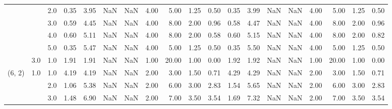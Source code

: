 \begin{tabular}{lllrrrrrrrrrrrrrrrr}
       &     & 2.0  &      0.35 &       3.95 &               NaN &                NaN & 4.00 &   5.00 &             1.25 &                         0.50 &      0.35 &       3.99 &               NaN &                NaN & 4.00 &   5.00 &             1.25 &                         0.50 \\
       &     & 3.0  &      0.59 &       4.45 &               NaN &                NaN & 4.00 &   8.00 &             2.00 &                         0.96 &      0.58 &       4.47 &               NaN &                NaN & 4.00 &   8.00 &             2.00 &                         0.96 \\
       &     & 4.0  &      0.60 &       5.11 &               NaN &                NaN & 4.00 &   8.00 &             2.00 &                         0.58 &      0.60 &       5.15 &               NaN &                NaN & 4.00 &   8.00 &             2.00 &                         0.82 \\
       &     & 5.0  &      0.35 &       5.47 &               NaN &                NaN & 4.00 &   5.00 &             1.25 &                         0.50 &      0.35 &       5.50 &               NaN &                NaN & 4.00 &   5.00 &             1.25 &                         0.50 \\
       & 3.0 & 1.0  &      1.91 &       1.91 &               NaN &                NaN & 1.00 &  20.00 &             1.00 &                         0.00 &      1.92 &       1.92 &               NaN &                NaN & 1.00 &  20.00 &             1.00 &                         0.00 \\
(6, 2) & 1.0 & 1.0  &      4.19 &       4.19 &               NaN &                NaN & 2.00 &   3.00 &             1.50 &                         0.71 &      4.29 &       4.29 &               NaN &                NaN & 2.00 &   3.00 &             1.50 &                         0.71 \\
       &     & 2.0  &      1.06 &       5.38 &               NaN &                NaN & 2.00 &   6.00 &             3.00 &                         2.83 &      1.54 &       5.65 &               NaN &                NaN & 2.00 &   6.00 &             3.00 &                         2.83 \\
       &     & 3.0  &      1.48 &       6.90 &               NaN &                NaN & 2.00 &   7.00 &             3.50 &                         3.54 &      1.69 &       7.32 &               NaN &                NaN & 2.00 &   7.00 &             3.50 &                         3.54 \\

\end{tabular}
